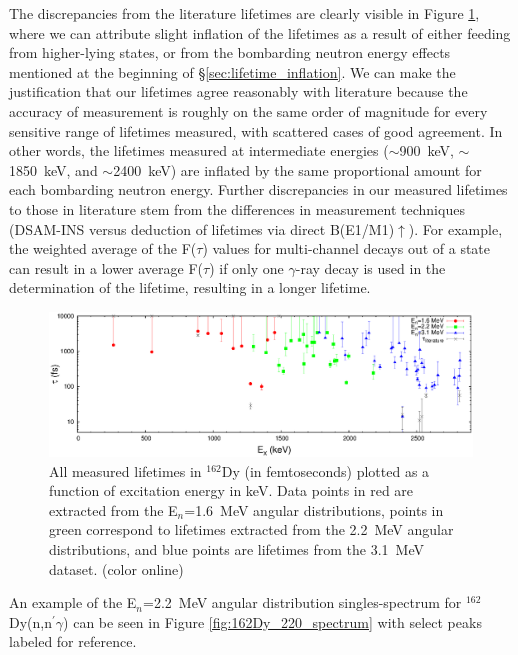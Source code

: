 The discrepancies from the literature lifetimes are clearly visible in Figure \ref{fig:162Dy_viz_lifetimes}, where we can attribute slight inflation of the lifetimes as a result of either feeding from higher-lying states, or from the bombarding neutron energy effects mentioned at the beginning of \S \ref{sec:lifetime_inflation}. We can make the justification that our lifetimes agree reasonably with literature because the accuracy of measurement is roughly on the same order of magnitude for every sensitive range of lifetimes measured, with scattered cases of good agreement. In other words, the lifetimes measured at intermediate energies ($\sim$900~keV, $\sim$1850~keV, and $\sim$2400~keV) are inflated by the same proportional amount for each bombarding neutron energy. Further discrepancies in our measured lifetimes to those in literature stem from the differences in measurement techniques (DSAM-INS versus deduction of lifetimes via direct B(E1/M1)$\uparrow$). For example, the weighted average of the F($\tau$) values for multi-channel decays out of a state can result in a lower average F($\tau$) if only one $\gamma$-ray decay is used in the determination of the lifetime, resulting in a longer lifetime. 

\begin{figure}[h!]
\begin{center}
\includegraphics[width=0.999\textwidth]{figures/162Dy_viz_lifetimes.eps}
\caption{All measured lifetimes in $^{162}$Dy (in femtoseconds) plotted as a function of excitation energy in keV. Data points in red are extracted from the E$_n$=1.6~MeV angular distributions, points in green correspond to lifetimes extracted from the 2.2~MeV angular distributions, and blue points are lifetimes from the 3.1~MeV dataset. (color online) \label{fig:162Dy_viz_lifetimes}}
\end{center}
\end{figure}

An example of the E$_n$=2.2~MeV angular distribution singles-spectrum for $^{162}$Dy(n,n$^\prime\gamma$) can be seen in Figure \ref{fig:162Dy_220_spectrum} with select peaks labeled for reference.


